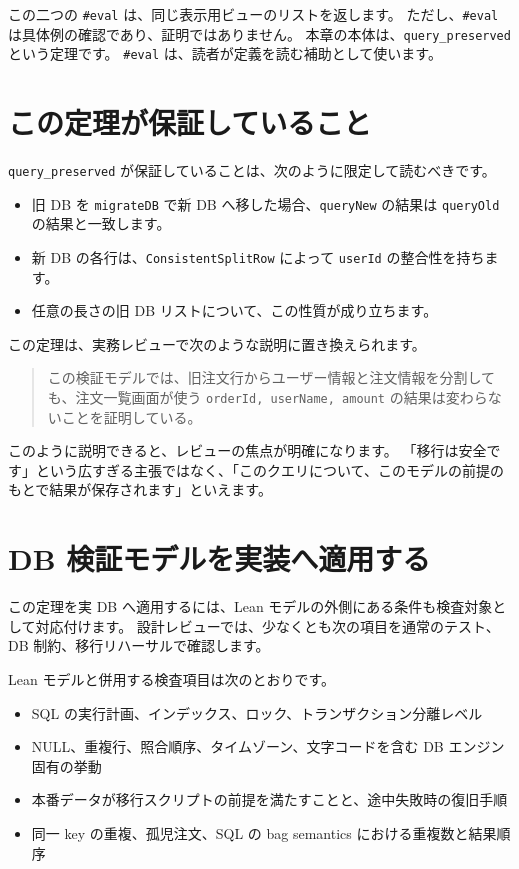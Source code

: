 この二つの \texttt{\#eval} は、同じ表示用ビューのリストを返します。
ただし、\texttt{\#eval} は具体例の確認であり、証明ではありません。
本章の本体は、\texttt{query\_preserved} という定理です。
\texttt{\#eval} は、読者が定義を読む補助として使います。

\section{この定理が保証していること}

\texttt{query\_preserved} が保証していることは、次のように限定して読むべきです。

\begin{itemize}
\item 旧 DB を \texttt{migrateDB} で新 DB へ移した場合、\texttt{queryNew} の結果は \texttt{queryOld} の結果と一致します。
\item 新 DB の各行は、\texttt{ConsistentSplitRow} によって \texttt{userId} の整合性を持ちます。
\item 任意の長さの旧 DB リストについて、この性質が成り立ちます。
\end{itemize}

この定理は、実務レビューで次のような説明に置き換えられます。

\begin{quote}
この検証モデルでは、旧注文行からユーザー情報と注文情報を分割しても、注文一覧画面が使う \texttt{orderId, userName, amount} の結果は変わらないことを証明している。
\end{quote}

このように説明できると、レビューの焦点が明確になります。
「移行は安全です」という広すぎる主張ではなく、「このクエリについて、このモデルの前提のもとで結果が保存されます」といえます。

\section{DB 検証モデルを実装へ適用する}

この定理を実 DB へ適用するには、Lean モデルの外側にある条件も検査対象として対応付けます。
設計レビューでは、少なくとも次の項目を通常のテスト、DB 制約、移行リハーサルで確認します。

Lean モデルと併用する検査項目は次のとおりです。
\begin{itemize}
\item SQL の実行計画、インデックス、ロック、トランザクション分離レベル
\item NULL、重複行、照合順序、タイムゾーン、文字コードを含む DB エンジン固有の挙動
\item 本番データが移行スクリプトの前提を満たすことと、途中失敗時の復旧手順
\item 同一 key の重複、孤児注文、SQL の bag semantics における重複数と結果順序
\end{itemize}

